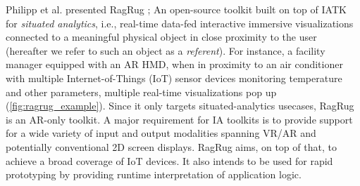 \documentclass{vgtc}                          %
\begin{document}
Philipp et al. presented RagRug \cite{ragrug_toolkit}; An open-source
\cite{ragrug:repo} toolkit built on top of IATK
for \textit{situated analytics}, i.e., real-time data-fed interactive immersive
visualizations connected to a meaningful physical object in close proximity to
the user (hereafter we refer to such an object as a \textit{referent}).
For instance, a facility manager equipped with an AR HMD, when in proximity to
an air conditioner with multiple Internet-of-Things (IoT)
sensor devices monitoring temperature and other parameters, multiple real-time
visualizations pop up (\autoref{fig:ragrug_example}). Since it only targets
situated-analytics usecases, RagRug is an AR-only toolkit.
A major requirement for IA toolkits is to provide support for a wide variety of
input and output modalities spanning VR/AR and potentially conventional 2D
screen displays. RagRug aims, on top of that, to achieve a broad coverage of
IoT devices. It also intends to be used for rapid prototyping by providing
runtime interpretation of application logic.

\smallskip
\end{document}
